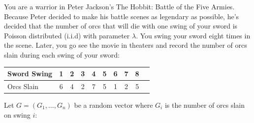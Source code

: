 \documentclass[letterpaper]{article}
\begin{document}
\noindent
You are a warrior in Peter Jackson's The Hobbit: Battle of the Five Armies. 
Because Peter decided to make his battle scenes as legendary as possible, 
he's decided that the number of orcs that will die with one swing of your sword is Poisson distributed (i.i.d) with parameter
$\lambda$. You swing your sword eight times in the scene. Later, you go see the movie in theaters
and record the number of orcs slain during each swing of your sword:

\begin{center}
\begin{tabular}{l*{8}{c}r}
Sword Swing         & 1 & 2 & 3 & 4 & 5 & 6 & 7 & 8 \\
\hline
Orcs Slain      & 6 & 4 & 2 & 7 & 5 & 1 & 2 & 5\\
\end{tabular}
\end{center}

\noindent
Let $G=(G_1,\dots,G_n)$ be a random vector where $G_i$ is the number
of orcs slain on swing $i$:
\end{document}
